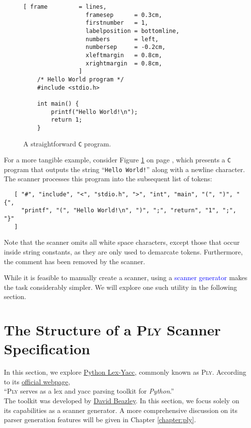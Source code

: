 \begin{figure}[!ht]
\centering
\begin{Verbatim}[ frame         = lines, 
                  framesep      = 0.3cm, 
                  firstnumber   = 1,
                  labelposition = bottomline,
                  numbers       = left,
                  numbersep     = -0.2cm,
                  xleftmargin   = 0.8cm,
                  xrightmargin  = 0.8cm,
                ]
    /* Hello World program */
    #include <stdio.h>
    
    int main() {
        printf("Hello World!\n");
        return 1;
    }
\end{Verbatim}
\vspace*{-0.3cm}
\caption{A straightforward \texttt{C} program.}
\label{fig:hello-world.c}
\end{figure}

\noindent
For a more tangible example, consider Figure \ref{fig:hello-world.c} on page \pageref{fig:hello-world.c}, which presents a \texttt{C} program that outputs the string ``\texttt{Hello World!}'' along with a newline character. The scanner processes this program into the subsequent list of tokens:

\begin{verbatim}
   [ "#", "include", "<", "stdio.h", ">", "int", "main", "(", ")", "{",
     "printf", "(", "Hello World!\n", ")", ";", "return", "1", ";", "}"
   ]
\end{verbatim}
Note that the scanner omits all white space characters, except those that occur inside string constants, as
they are only used to demarcate tokens.  Furthermore, the comment has been removed by the scanner.

While it is feasible to manually create a scanner, using a \textcolor{blue}{scanner generator} makes the task
considerably simpler. We will explore one such utility in the following section. 

\section{The Structure of a \textsc{Ply} Scanner Specification}
In this section, we explore \href{https://www.dabeaz.com/ply/}{Python Lex-Yacc}, commonly known as
\textsc{Ply}.  According to its \href{https://www.dabeaz.com/ply/}{official webpage},
\\[0.2cm]
\hspace*{1.3cm}
``\textsc{Ply} serves as a lex and yacc parsing toolkit for \textsl{Python}.''
\\[0.2cm]
The toolkit was developed by
\href{https://www.dabeaz.com/}{David Beazley}. In this section, we focus solely on its capabilities as a
scanner generator. A more comprehensive discussion on its parser generation features will be given in Chapter
\ref{chapter:ply}. 

